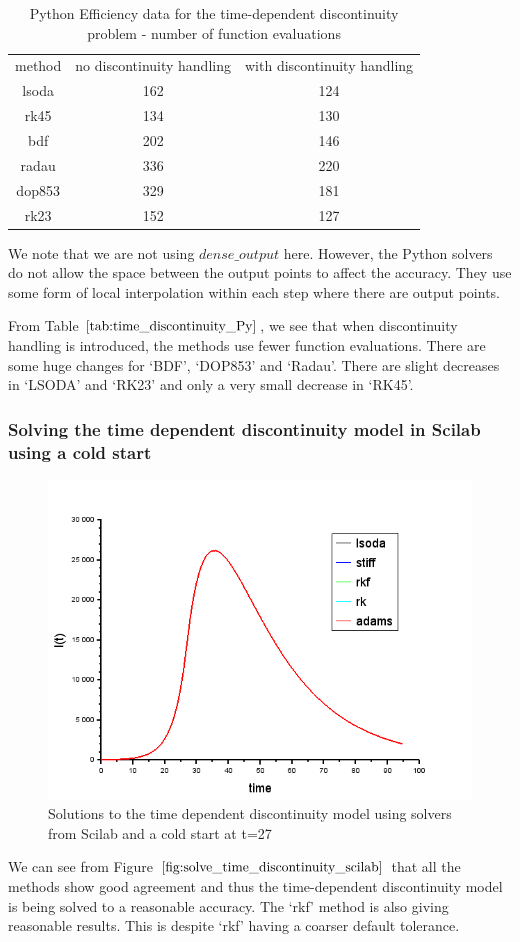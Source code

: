 \begin{table}[H]
\caption {Python Efficiency data for the time-dependent discontinuity problem - number of function evaluations} 
\label{tab:time_discontinuity_Py} 
\begin{center}
\begin{tabular}{ c c c }
method & no discontinuity handling & with discontinuity handling \\ 
lsoda & 162 & 124 \\
rk45 & 134 & 130 \\
bdf & 202 & 146 \\
radau & 336 & 220 \\
dop853 & 329 & 181 \\
rk23 & 152 & 127 \\
\end{tabular}
\end{center}
\end{table}

We note that we are not using $dense\_output$ here. However, the Python solvers do not allow the space between the output points to affect the accuracy. They use some form of local interpolation within each step where there are output points.

From Table $\ref{tab:time_discontinuity_Py}$, we see that when discontinuity handling is introduced, the methods use fewer function evaluations. There are some huge changes for `BDF', `DOP853' and `Radau'. There are slight decreases in `LSODA' and `RK23' and only a very small decrease in `RK45'. 

\subsubsection{Solving the time dependent discontinuity model in Scilab using a cold start} 
\begin{figure}[H]
\centering
\includegraphics[width=0.7\linewidth]{./figures/solve_time_discontinuity_scilab}
\caption{Solutions to the time dependent discontinuity model using solvers from Scilab and a cold start at t=27}
\label{fig:solve_time_discontinuity_scilab}
\end{figure}
We can see from Figure $\ref{fig:solve_time_discontinuity_scilab}$ that all the methods show good agreement and thus the time-dependent discontinuity model is being solved to a reasonable accuracy. The `rkf' method is also giving reasonable results. This is despite `rkf' having a coarser default tolerance.

